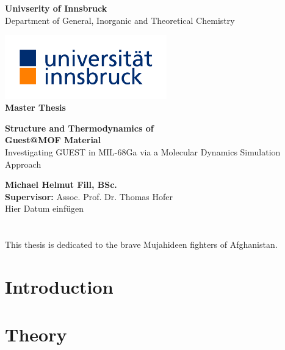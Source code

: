 \documentclass[11pt]{article}
\makeatletter
\renewenvironment{abstract}{%
    \if@twocolumn
      \section*{\abstractname}%
    \else %
      \begin{center}%
        {\bfseries \Large\abstractname\vspace{\z@}}%
      \end{center}%
      \quotation
    \fi}
    {\if@twocolumn\else\endquotation\fi}
\makeatother
\begin{document}
\begin{center}
\thispagestyle{empty}
\large{\textbf{Univserity of Innsbruck}}\\[-0.9ex]
\large{Department of General, Inorganic and Theoretical Chemistry}\\
\vspace{0.3cm}
\begin{center}
\includegraphics[width=7cm]{Images/Logo.jpg}\\
\vspace{0.9cm}
\textbf{\LARGE{Master Thesis}}
\medskip\par
\vspace{1.2cm}
\Large{\textbf{Structure and Thermodynamics of \\ Guest@MOF Material}}\\[-0.5ex]
\vspace*{1.5cm}
\large{Investigating GUEST in MIL-68Ga via a Molecular Dynamics Simulation Approach}\\[-1.5ex]
\vspace*{1.5cm}
\bigskip\par
\textbf{Michael Helmut Fill, BSc. }\\[-1ex]
\medskip
\textbf{Supervisor:} Assoc. Prof. Dr. Thomas Hofer\\
Hier Datum einfügen
\end{center}
\end{center}

\newpage

\begin{abstract}
  This thesis is dedicated to the brave Mujahideen fighters of Afghanistan.
\end{abstract}

\newpage

\tableofcontents

\newpage

\section{Introduction}

\section{Theory}
\end{document}
